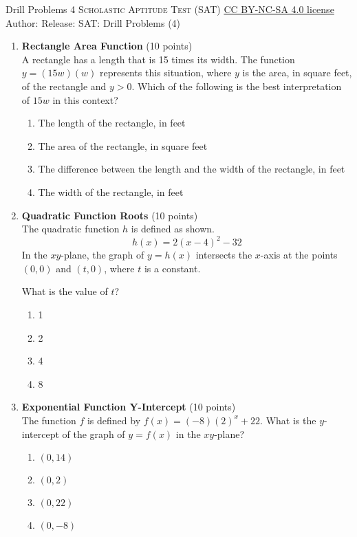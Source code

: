 \newpage\handout
{Drill Problems 4}
{\textsc{Scholastic Aptitude Test (SAT)}}
{\href{https://creativecommons.org/licenses/by-nc-sa/4.0/}{CC BY-NC-SA 4.0 license}}
{Author: \BookAuthor}{Release: \generatedOn}
{SAT: Drill Problems (4)}



\begin{enumerate}
  \item \textbf{Rectangle Area Function} (10 points)\\
  A rectangle has a length that is 15 times its width. The function $y=(15w)(w)$ represents this situation, where $y$ is the area, in square feet, of the rectangle and $y>0$. Which of the following is the best interpretation of $15w$ in this context?
  \begin{enumerate}[label=(\Alph*)]
    \item The length of the rectangle, in feet
    \item The area of the rectangle, in square feet
    \item The difference between the length and the width of the rectangle, in feet
    \item The width of the rectangle, in feet
  \end{enumerate}
  \begin{subanswer}
  \end{subanswer}

  \item \textbf{Quadratic Function Roots} (10 points)\\
  The quadratic function $h$ is defined as shown.
  \[
  h(x)=2(x-4)^{2}-32
  \]
  In the $xy$-plane, the graph of $y=h(x)$ intersects the $x$-axis at the points $(0,0)$ and $(t,0)$, where $t$ is a constant.
  
  What is the value of $t$?
  \begin{enumerate}[label=(\Alph*)]
    \item 1
    \item 2
    \item 4
    \item 8
  \end{enumerate}
  \begin{subanswer}
  \end{subanswer}

  \item \textbf{Exponential Function Y-Intercept} (10 points)\\
  The function $f$ is defined by $f(x)=(-8)(2)^{x}+22$. What is the $y$-intercept of the graph of $y=f(x)$ in the $xy$-plane?
  \begin{enumerate}[label=(\Alph*)]
    \item $(0,14)$
    \item $(0,2)$
    \item $(0,22)$
    \item $(0,-8)$
  \end{enumerate}
  \begin{subanswer}
  \end{subanswer}


\end{enumerate}

